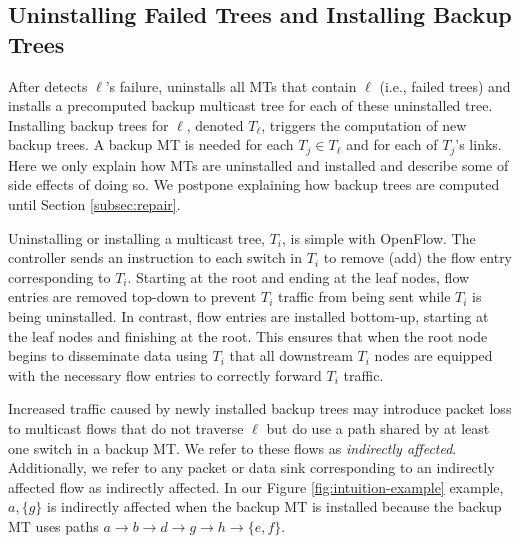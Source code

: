 
\subsection{Uninstalling Failed Trees and Installing Backup Trees}
\label{subsec:uninstall-install}

After \fl detects $\ell$'s failure, \mdr uninstalls all MTs that contain $\ell$ (i.e., failed trees) and installs a precomputed backup multicast tree for each of these uninstalled tree. Installing 
backup trees for $\ell$, denoted $T_{\ell}$, triggers the computation of new backup trees.  A backup MT is needed for each $T_j \in T_{\ell}$ and for each of $T_j$'s links.
Here we only explain how MTs are uninstalled and installed and describe some of side effects of doing so. We postpone explaining how backup trees are computed until Section \ref{subsec:repair}.

Uninstalling or installing a multicast tree, $T_i$, is simple with OpenFlow.  The controller sends an instruction to each switch in $T_i$ to remove (add) the flow entry corresponding to $T_i$.
Starting at the root and ending at the leaf nodes, flow entries are removed top-down to prevent $T_i$ traffic from being sent while $T_i$ is being uninstalled. 
In contrast, flow entries are installed bottom-up, starting at the leaf
nodes and finishing at the root.  This ensures that when the root node begins to disseminate data using $T_i$ that all downstream $T_i$ nodes are equipped with the necessary flow entries
to correctly forward $T_i$ traffic.

Increased traffic caused by newly installed backup trees may introduce packet loss to multicast flows that do not traverse $\ell$ but do use a path shared by at
least one switch in a backup MT.  
We refer to these flows as \emph{indirectly affected}. Additionally, we refer to any packet or data sink corresponding to an indirectly affected flow as indirectly affected.
In our Figure \ref{fig:intuition-example} example, $a,\{g\}$ is indirectly affected when the backup MT is installed because the backup MT uses paths 
$a \rightarrow b \rightarrow d \rightarrow g \rightarrow h \rightarrow \{e,f\}$. 

